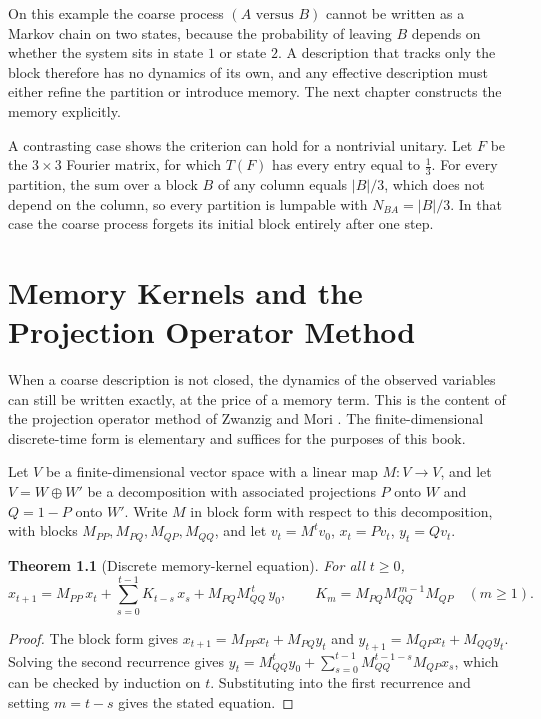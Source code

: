 \documentclass[11pt,oneside]{book}
\newtheorem{theorem}{Theorem}[chapter]
\theoremstyle{definition}
\theoremstyle{remark}
\begin{document}
On this example the coarse process $(A\text{ versus }B)$ cannot be written as a Markov chain on two states, because the probability of leaving $B$ depends on whether the system sits in state $1$ or state $2$. A description that tracks only the block therefore has no dynamics of its own, and any effective description must either refine the partition or introduce memory. The next chapter constructs the memory explicitly.

A contrasting case shows the criterion can hold for a nontrivial unitary. Let $F$ be the $3\times3$ Fourier matrix, for which $T(F)$ has every entry equal to $\tfrac13$. For every partition, the sum over a block $B$ of any column equals $|B|/3$, which does not depend on the column, so every partition is lumpable with $N_{BA}=|B|/3$. In that case the coarse process forgets its initial block entirely after one step.

\chapter{Memory Kernels and the Projection Operator Method}\label{ch:memory}

When a coarse description is not closed, the dynamics of the observed variables can still be written exactly, at the price of a memory term. This is the content of the projection operator method of Zwanzig and Mori \cite{zwanzig1961,mori1965}. The finite-dimensional discrete-time form is elementary and suffices for the purposes of this book.

Let $V$ be a finite-dimensional vector space with a linear map $M\colon V\to V$, and let $V=W\oplus W'$ be a decomposition with associated projections $P$ onto $W$ and $Q=1-P$ onto $W'$. Write $M$ in block form with respect to this decomposition, with blocks $M_{PP},M_{PQ},M_{QP},M_{QQ}$, and let $v_t=M^tv_0$, $x_t=Pv_t$, $y_t=Qv_t$.

\begin{theorem}[Discrete memory-kernel equation]\label{thm:kernel}
For all $t\geq0$,
\[
x_{t+1}=M_{PP}\,x_t+\sum_{s=0}^{t-1}K_{t-s}\,x_s+M_{PQ}M_{QQ}^{\,t}\,y_0,\qquad K_m=M_{PQ}M_{QQ}^{\,m-1}M_{QP}\quad(m\geq1).
\]
\end{theorem}

\begin{proof}
The block form gives $x_{t+1}=M_{PP}x_t+M_{PQ}y_t$ and $y_{t+1}=M_{QP}x_t+M_{QQ}y_t$. Solving the second recurrence gives $y_t=M_{QQ}^ty_0+\sum_{s=0}^{t-1}M_{QQ}^{t-1-s}M_{QP}x_s$, which can be checked by induction on $t$. Substituting into the first recurrence and setting $m=t-s$ gives the stated equation.
\end{proof}
\end{document}
